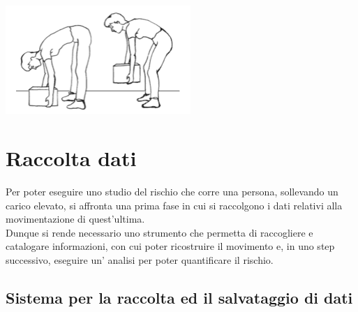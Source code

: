 \documentclass[a4paper, oneside]{book}
\begin{document}
\begin{center}
\begin{minipage}{0.48\linewidth}
\begin{center}
\includegraphics[width=70mm,scale=0.7]{./images/sollevamento_scorretto.png} 
\vspace{3mm}
\label{fig:sollevamento_scorretto}
\end{center}
\end{minipage}
\end{center}




	\clearpage

	\chapter{Raccolta dati}
Per poter eseguire uno studio del rischio che corre una persona, sollevando un carico elevato, si affronta una prima fase in cui si raccolgono i dati relativi alla movimentazione di quest'ultima. \\
Dunque si rende necessario uno strumento che permetta di raccogliere e catalogare informazioni, con cui poter ricostruire il movimento e, in uno step successivo, eseguire un' analisi per poter quantificare il rischio. \\


	\section{Sistema per la raccolta ed il salvataggio di dati}
\end{document}

